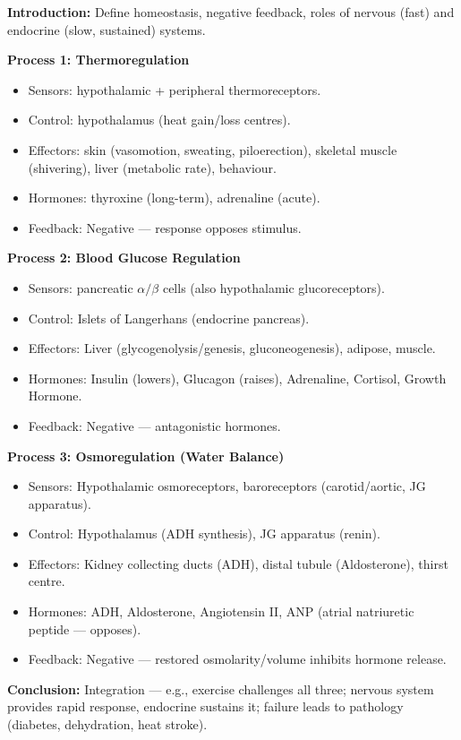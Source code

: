 \documentclass[11pt]{article}
\begin{document}
\begin{corrige}
\textbf{Introduction:} Define homeostasis, negative feedback, roles of nervous (fast) and endocrine (slow, sustained) systems.

\textbf{Process 1: Thermoregulation}
\begin{itemize}
\item Sensors: hypothalamic + peripheral thermoreceptors.
\item Control: hypothalamus (heat gain/loss centres).
\item Effectors: skin (vasomotion, sweating, piloerection), skeletal muscle (shivering), liver (metabolic rate), behaviour.
\item Hormones: thyroxine (long-term), adrenaline (acute).
\item Feedback: Negative — response opposes stimulus.
\end{itemize}

\textbf{Process 2: Blood Glucose Regulation}
\begin{itemize}
\item Sensors: pancreatic $\alpha/\beta$ cells (also hypothalamic glucoreceptors).
\item Control: Islets of Langerhans (endocrine pancreas).
\item Effectors: Liver (glycogenolysis/genesis, gluconeogenesis), adipose, muscle.
\item Hormones: Insulin (lowers), Glucagon (raises), Adrenaline, Cortisol, Growth Hormone.
\item Feedback: Negative — antagonistic hormones.
\end{itemize}

\textbf{Process 3: Osmoregulation (Water Balance)}
\begin{itemize}
\item Sensors: Hypothalamic osmoreceptors, baroreceptors (carotid/aortic, JG apparatus).
\item Control: Hypothalamus (ADH synthesis), JG apparatus (renin).
\item Effectors: Kidney collecting ducts (ADH), distal tubule (Aldosterone), thirst centre.
\item Hormones: ADH, Aldosterone, Angiotensin II, ANP (atrial natriuretic peptide — opposes).
\item Feedback: Negative — restored osmolarity/volume inhibits hormone release.
\end{itemize}

\textbf{Conclusion:} Integration — e.g., exercise challenges all three; nervous system provides rapid response, endocrine sustains it; failure leads to pathology (diabetes, dehydration, heat stroke).
\end{corrige}
\end{document}
